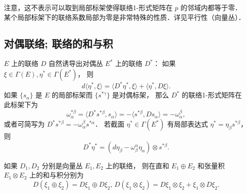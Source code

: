 注意，这不表示可以取到局部标架使得联络1-形式矩阵在 $p$ 的邻域内都等于零． 某个局部标架下的联络系数局部为零是非常特殊的性质．详见平行性（向量丛）．

\subsection{对偶联络; 联络的和与积}
$E$ 上的联络 $D$ 自然诱导出对偶丛 $E^*$ 上的联络 $D^*$： 如果 $\xi\in\Gamma(E),\eta^*\in\Gamma(E^*)$， 则
$$
d\langle \eta^*,\xi\rangle=\langle D^*\eta^*,\xi\rangle+\langle \eta^*,D\xi\rangle.
$$
如果 $\{s_\alpha\}$ 是 $E$ 的局部标架而 $\{s^{*\gamma}\}$ 是对偶标架， 那么 $D^*$ 的联络1-形式矩阵在此标架下为
$$
\omega^{*\beta}_\alpha
=\langle D^*s^{*\beta},s_\alpha\rangle
=-\langle s^{*\beta},Ds_\alpha\rangle
=-\omega^\beta_\alpha,
$$
或者可简写为 $D^*s^{*\beta}=-\omega^\beta_\alpha s^{*\alpha}$． 若截面 $\eta^*\in\Gamma(E^*)$ 有局部表达式 $\eta^*=\eta_\beta s^{*\beta}$， 则
$$
D^*\eta^*=(d\eta_\beta-\omega_\beta^\alpha\eta_\alpha)\otimes s^{*\beta}.
$$

如果 $D_1,D_2$ 分别是向量丛 $E_1,E_2$ 上的联络， 则在直和 $E_1\oplus E_2$ 和张量积 $E_1\otimes E_2$ 上的和与积分别为
$$
D(\xi_1\oplus \xi_2)=D\xi_1\oplus D\xi_2,
\,
D(\xi_1\otimes \xi_2)=D\xi_1\otimes \xi_2+\xi_1\otimes D\xi_2.
$$